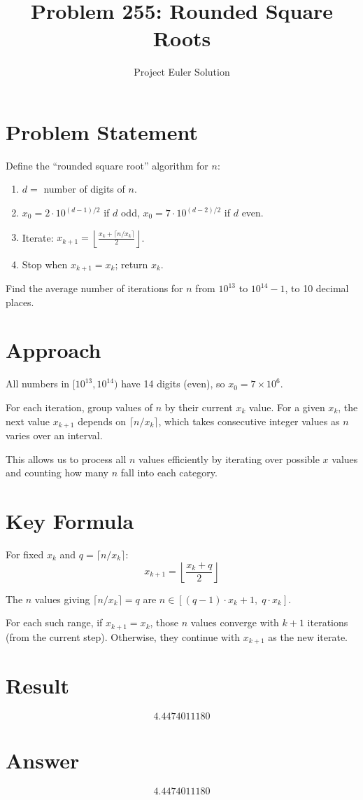 \documentclass[12pt]{article}
\title{Problem 255: Rounded Square Roots}
\author{Project Euler Solution}
\date{}
\begin{document}
\maketitle

\section{Problem Statement}
Define the ``rounded square root'' algorithm for $n$:
\begin{enumerate}
    \item $d = $ number of digits of $n$.
    \item $x_0 = 2 \cdot 10^{(d-1)/2}$ if $d$ odd, $x_0 = 7 \cdot 10^{(d-2)/2}$ if $d$ even.
    \item Iterate: $x_{k+1} = \left\lfloor \frac{x_k + \lceil n/x_k \rceil}{2} \right\rfloor$.
    \item Stop when $x_{k+1} = x_k$; return $x_k$.
\end{enumerate}

Find the average number of iterations for $n$ from $10^{13}$ to $10^{14}-1$, to 10 decimal places.

\section{Approach}

All numbers in $[10^{13}, 10^{14})$ have 14 digits (even), so $x_0 = 7 \times 10^6$.

For each iteration, group values of $n$ by their current $x_k$ value. For a given $x_k$, the next value $x_{k+1}$ depends on $\lceil n/x_k \rceil$, which takes consecutive integer values as $n$ varies over an interval.

This allows us to process all $n$ values efficiently by iterating over possible $x$ values and counting how many $n$ fall into each category.

\section{Key Formula}

For fixed $x_k$ and $q = \lceil n/x_k \rceil$:
\[
x_{k+1} = \left\lfloor \frac{x_k + q}{2} \right\rfloor
\]

The $n$ values giving $\lceil n/x_k \rceil = q$ are $n \in [(q-1) \cdot x_k + 1, \; q \cdot x_k]$.

For each such range, if $x_{k+1} = x_k$, those $n$ values converge with $k+1$ iterations (from the current step). Otherwise, they continue with $x_{k+1}$ as the new iterate.

\section{Result}
\[
\boxed{4.4474011180}
\]

\section{Answer}

\[
\boxed{4.4474011180}
\]
\end{document}
